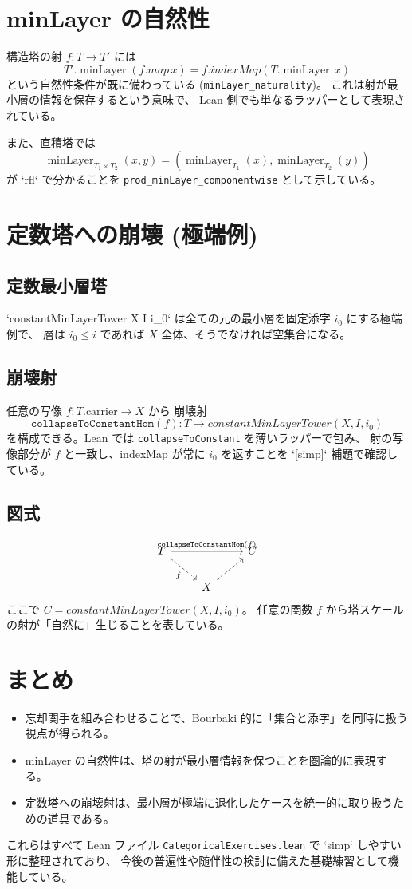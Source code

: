 \documentclass[a4paper]{ltjsarticle}
\DeclareMathOperator{\minLayer}{minLayer}  %
\begin{document}
\section{minLayer の自然性}

構造塔の射 $f : T \to T'$ には
\[
  T'.\minLayer(f.map\,x) = f.indexMap(T.\minLayer\,x)
\]
という自然性条件が既に備わっている (\texttt{minLayer\_naturality})。
これは射が最小層の情報を保存するという意味で、
Lean 側でも単なるラッパーとして表現されている。

また、直積塔では
\[
  \minLayer_{T_1 \times T_2}(x,y) =
    (\minLayer_{T_1}(x), \minLayer_{T_2}(y))
\]
が `rfl` で分かることを \texttt{prod\_minLayer\_componentwise} として示している。

\section{定数塔への崩壊 (極端例)}
\subsection{定数最小層塔}
`constantMinLayerTower X I i_0` は全ての元の最小層を固定添字 $i_0$ にする極端例で、
層は $i_0 \le i$ であれば $X$ 全体、そうでなければ空集合になる。

\subsection{崩壊射}
任意の写像 $f : T.\mathrm{carrier} \to X$ から
崩壊射
\[
  \texttt{collapseToConstantHom}(f) : T \to constantMinLayerTower(X, I, i_0)
\]
を構成できる。Lean では \texttt{collapseToConstant} を薄いラッパーで包み、
射の写像部分が $f$ と一致し、indexMap が常に $i_0$ を返すことを `[simp]` 補題で確認している。

\subsection{図式}
\[
\begin{tikzcd}
  T \arrow[rr, "\texttt{collapseToConstantHom}(f)"] \arrow[dr, dashed, "f"'] && C \\
  & X \arrow[ur, dashed] &
\end{tikzcd}
\]
ここで $C = constantMinLayerTower(X,I,i_0)$。
任意の関数 $f$ から塔スケールの射が「自然に」生じることを表している。

\section*{まとめ}
\begin{itemize}
  \item 忘却関手を組み合わせることで、Bourbaki 的に「集合と添字」を同時に扱う視点が得られる。
  \item minLayer の自然性は、塔の射が最小層情報を保つことを圏論的に表現する。
  \item 定数塔への崩壊射は、最小層が極端に退化したケースを統一的に取り扱うための道具である。
\end{itemize}
これらはすべて Lean ファイル \texttt{CategoricalExercises.lean} で `simp` しやすい形に整理されており、
今後の普遍性や随伴性の検討に備えた基礎練習として機能している。
\end{document}
